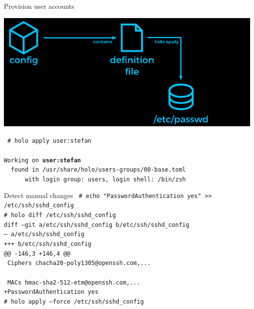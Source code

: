 \documentclass{beamer}
\begin{document}
\begin{frame}[plain,t]{Provision user accounts}
 \vspace{-1em}\begin{center}
  \includegraphics[width=\linewidth]{diagram-users.pdf}
 \end{center}
 \small\texttt{%
  {\color{holoonblack}\#} holo apply user:stefan\\
  ~\\
  Working on \textbf{user:stefan}\\
  ~~found in /usr/share/holo/users-groups/00-base.toml\\
  ~~~~~~with login group: users, login shell: /bin/zsh
 }
\end{frame}

\begin{frame}[plain,c]{Detect manual changes}
 \small\texttt{%
  {\color{holoonblack}\#} echo "PasswordAuthentication yes" >> /etc/ssh/sshd\_config\\[0.5em]
  {\color{holoonblack}\#} holo diff /etc/ssh/sshd\_config\\
  diff --git a/etc/ssh/sshd\_config b/etc/ssh/sshd\_config\\
  --- a/etc/ssh/sshd\_config\\
  +++ b/etc/ssh/sshd\_config\\
  @@ -146,3 +146,4 @@\\
  ~Ciphers~chacha20-poly1305@openssh.com,...\\
  ~\\
  ~MACs~hmac-sha2-512-etm@openssh.com,...\\
  +PasswordAuthentication yes\\[0.5em]
  {\color{holoonblack}\#} holo apply --force /etc/ssh/sshd\_config
 }
\end{frame}
\end{document}
